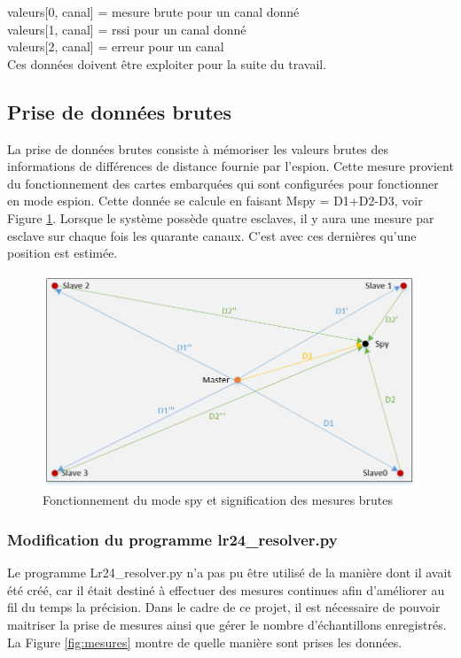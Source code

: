 valeurs[0, canal] = mesure brute pour un canal donné\.\\
valeurs[1, canal] = rssi pour un canal donné\.\\
valeurs[2, canal] = erreur pour un canal\.\\

Ces données doivent être exploiter pour la suite du travail. 

\subsection{Prise de données brutes}
La prise de données brutes consiste à mémoriser les valeurs brutes des informations de différences de distance fournie par l'espion. Cette mesure provient du fonctionnement des cartes embarquées qui sont configurées pour fonctionner en mode espion. Cette donnée se calcule en faisant Mspy = D1+D2-D3, voir Figure \ref{fig:mesures3}. Lorsque le système possède quatre esclaves, il y aura une mesure par esclave sur chaque fois les quarante canaux. C'est avec ces dernières qu'une position est estimée. 

\begin{figure}[htp]
 \begin{center}
  \includegraphics[scale=0.7]{figures/mesures3.png}
  \caption{Fonctionnement du mode spy et signification des mesures brutes}
  \label{fig:mesures3} %
 \end{center}
\end{figure}
 
\subsubsection{Modification du programme lr24\_resolver.py}
Le programme Lr24\_resolver.py n'a pas pu être utilisé de la manière dont il avait été créé, car il était destiné à effectuer des mesures continues afin d'améliorer au fil du temps la précision. Dans le cadre de ce projet, il est nécessaire de pouvoir maitriser la prise de mesures ainsi que gérer le nombre d'échantillons enregistrés. La Figure \ref{fig:mesures} montre de quelle manière sont prises les données.

